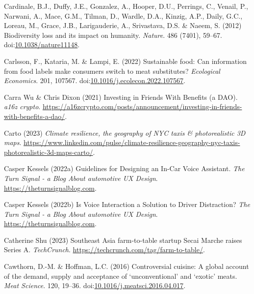 \documentclass[
  letterpaper,
  DIV=11,
  numbers=noendperiod]{scrartcl}
\newlength{\cslhangindent}
\newenvironment{CSLReferences}[2] %
 {\begin{list}{}{%
  \setlength{\itemindent}{0pt}
  \setlength{\leftmargin}{0pt}
  \setlength{\parsep}{0pt}
  \ifodd #1
   \setlength{\leftmargin}{\cslhangindent}
   \setlength{\itemindent}{-1\cslhangindent}
  \fi
  \setlength{\itemsep}{#2\baselineskip}}}
 {\end{list}}
\begin{document}
\begin{CSLReferences}{0}{1}
Cardinale, B.J., Duffy, J.E., Gonzalez, A., Hooper, D.U., Perrings, C.,
Venail, P., Narwani, A., Mace, G.M., Tilman, D., Wardle, D.A., Kinzig,
A.P., Daily, G.C., Loreau, M., Grace, J.B., Larigauderie, A.,
Srivastava, D.S. \& Naeem, S. (2012) Biodiversity loss and its impact on
humanity. \emph{Nature}. 486 (7401), 59--67.
doi:\href{https://doi.org/10.1038/nature11148}{10.1038/nature11148}.

Carlsson, F., Kataria, M. \& Lampi, E. (2022) Sustainable food: {Can}
information from food labels make consumers switch to meat substitutes?
\emph{Ecological Economics}. 201, 107567.
doi:\href{https://doi.org/10.1016/j.ecolecon.2022.107567}{10.1016/j.ecolecon.2022.107567}.

Carra Wu \& Chris Dixon (2021) Investing in {Friends With Benefits} (a
{DAO}). \emph{a16z crypto}.
\url{https://a16zcrypto.com/posts/announcement/investing-in-friends-with-benefits-a-dao/}.

Carto (2023) \emph{Climate resilience, the geography of {NYC} taxis \&
photorealistic {3D} maps}.
\url{https://www.linkedin.com/pulse/climate-resilience-geography-nyc-taxis-photorealistic-3d-maps-carto/}.

Casper Kessels (2022a) Guidelines for {Designing} an {In-Car Voice
Assistant}. \emph{The Turn Signal - a Blog About automotive UX Design}.
\url{https://theturnsignalblog.com}.

Casper Kessels (2022b) Is {Voice Interaction} a {Solution} to {Driver
Distraction}? \emph{The Turn Signal - a Blog About automotive UX
Design}. \url{https://theturnsignalblog.com}.

Catherine Shu (2023) Southeast {Asia} farm-to-table startup {Secai
Marche} raises {Series A}. \emph{TechCrunch}.
\url{https://techcrunch.com/tag/farm-to-table/}.

Cawthorn, D.-M. \& Hoffman, L.C. (2016) Controversial cuisine: {A}
global account of the demand, supply and acceptance of
{`unconventional'} and {`exotic'} meats. \emph{Meat Science}. 120,
19--36.
doi:\href{https://doi.org/10.1016/j.meatsci.2016.04.017}{10.1016/j.meatsci.2016.04.017}.


\end{CSLReferences}
\end{document}
